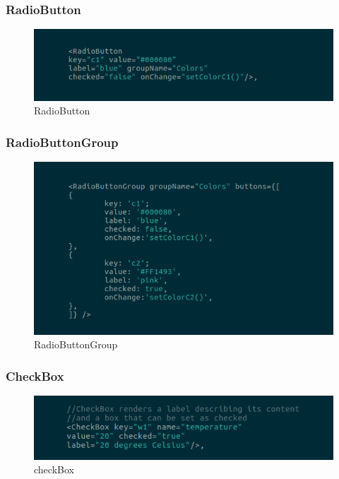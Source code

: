 \subsubsection{RadioButton}
\begin{figure}[H]
	\centering
	\includegraphics[width=14cm]{../../documenti/UserManualFramework/framework_view/7framework_view_radio.png}
	\caption{RadioButton}
\end{figure}

\subsubsection{RadioButtonGroup}
\begin{figure}[H]
	\centering
	\includegraphics[width=14cm]{../../documenti/UserManualFramework/framework_view/8framework_view_radio_group.png}
	\caption{RadioButtonGroup}
\end{figure}

\subsubsection{CheckBox}
\begin{figure}[H]
	\centering
	\includegraphics[width=14cm]{../../documenti/UserManualFramework/framework_view/9framework_view_check.png}
	\caption{checkBox}
\end{figure}

